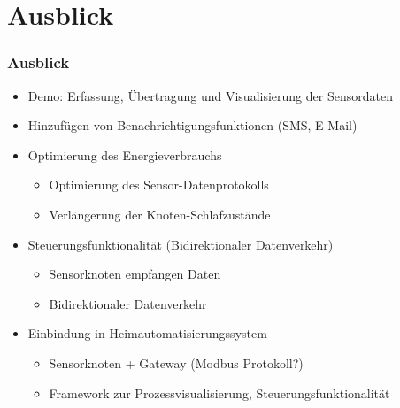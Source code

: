 \documentclass{beamer}
\begin{document}
\section{Ausblick}
\begin{frame}
\frametitle{Ausblick}

\begin{itemize}

\item Demo: Erfassung, Übertragung und Visualisierung der Sensordaten
\item Hinzufügen von Benachrichtigungsfunktionen (SMS, E-Mail)
\item Optimierung des Energieverbrauchs
	\begin{itemize}
	\item  Optimierung des Sensor-Datenprotokolls
	\item  Verlängerung der Knoten-Schlafzustände
	\end{itemize}

\item Steuerungsfunktionalität (Bidirektionaler Datenverkehr)
	\begin{itemize}
	\item  Sensorknoten empfangen Daten
	\item  Bidirektionaler Datenverkehr
	\end{itemize}

\item Einbindung in Heimautomatisierungssystem
	\begin{itemize}
	\item  Sensorknoten + Gateway (Modbus Protokoll?)
	\item  Framework zur Prozessvisualisierung, Steuerungsfunktionalität
	\end{itemize}
\end{itemize}
\end{frame}

\end{document}
